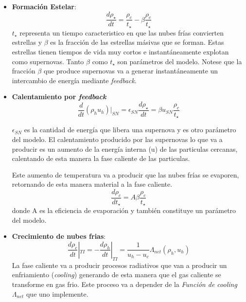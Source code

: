 \begin{itemize}
    \item \textbf{Formaci\'on Estelar}: 
    \begin{equation}
        \frac{d{\rho_{\star}}}{d{t}}=\frac{\rho_{c}}{t_{\star}}-\beta\frac{\rho_{c}}{t_{\star}}
    \end{equation}{}
    $t_{\star}$ representa un tiempo caracteristico en que las nubes fr\'ias convierten estrellas y $\beta$ es la fracci\'on de las estrellas m\'asivas que se forman. Estas estrellas tienen tiempos de vida muy cortos e instant\'aneamente explotan como supernovas. Tanto $\beta$ como $t_{\star}$ son par\'ametros del modelo. Notese que la fracci\'on $\beta$ que produce supernovas va a generar instant\'aneamente un intercambio de energ\'ia mediante \textit{feedback}. 
    
    \item \textbf{Calentamiento por \textit{feedback}}
    \begin{equation}
    \frac{d}{dt}(\rho_{h}u_{h})|_{SN}=\epsilon_{SN}\frac{d\rho_{\star}}{dt}=\beta u_{SN}\frac{\rho_{c}}{t_{\star}}
    \end{equation}{}
    
    $\epsilon_{SN}$ es la cantidad de energ\'ia que libera una supernova y es otro par\'ametro del modelo. El calentamiento producido por las supernovas lo que va a producir es un aumento de la energ\'ia interna (u) de las particulas cercanas, calentando de esta manera la fase caliente de las particulas.
    
    Este aumento de temperatura va a producir que las nubes fr\'ias se evaporen, retornando de esta manera material a la fase caliente. 
    \begin{equation}
        \frac{d\rho_{c}}{dt_{\star}}=A\beta\frac{\rho_{c}}{t_{\star}}
    \end{equation}{}
    donde A es la eficiencia de evaporaci\'on y tambi\'en constituye un par\'ametro del modelo. 
    
    \item \textbf{Crecimiento de nubes frias}: 
    \begin{equation}
        \frac{d\rho_{c}}{dt}|_{TI}=-\frac{d\rho_{h}}{dt}|_{TI}=\frac{1}{u_{h}-u_{c}}\Lambda_{net}(\rho_{h},u_{h})
    \end{equation}{}
    La fase caliente va a producir procesos radiativos que van a producir un enfriamiento (\textit{cooling}) generando de esta manera que el gas caliente se transforme en gas frio. Este proceso va a depender de la \textit{Funci\'on de cooling} $\Lambda_{net}$ que uno implemente. 
    
\end{itemize}{}


